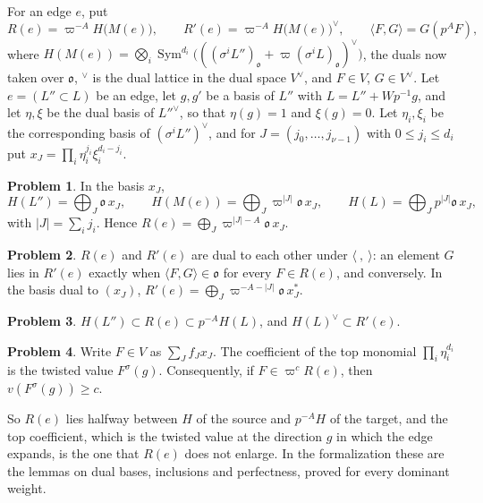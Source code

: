\documentclass[reqno]{amsart}
\theoremstyle{definition}
\newtheorem{problem}{Problem}[section]
\theoremstyle{plain}
\theoremstyle{remark}
\newcommand{\Sym}{\operatorname{Sym}}
\newcommand{\vo}{\mathfrak o}
\begin{document}
For an edge \(e\), put
\[
 R(e)=\varpi^{-A}H\bigl(M(e)\bigr),\qquad R'(e)=\varpi^{-A}H\bigl(M(e)\bigr)^\vee,\qquad \langle F,G\rangle=G(p^AF),
\]
where \(H(M(e))=\bigotimes_i\Sym^{d_i}\bigl(((\sigma^iL'')_\vo+\varpi(\sigma^iL)_\vo)^\vee\bigr)\), the duals now taken over \(\vo\), \({}^\vee\) is the dual lattice in the dual space \(V^\vee\), and \(F\in V\), \(G\in V^\vee\).  Let \(e=(L''\subset L)\) be an edge, let \(g,g'\) be a basis of \(L''\) with \(L=L''+Wp^{-1}g\), and let \(\eta,\xi\) be the dual basis of \(L''^\vee\), so that \(\eta(g)=1\) and \(\xi(g)=0\).  Let \(\eta_i,\xi_i\) be the corresponding basis of \((\sigma^iL'')^\vee\), and for \(J=(j_0,\dots,j_{\nu-1})\) with \(0\le j_i\le d_i\) put \(x_J=\prod_i\eta_i^{j_i}\xi_i^{d_i-j_i}\).

\begin{problem}\label{pr:adapted}
In the basis \(x_J\),
\[
 H(L'')=\bigoplus_J\vo\,x_J,\qquad H(M(e))=\bigoplus_J\varpi^{\lvert J\rvert}\vo\,x_J,\qquad H(L)=\bigoplus_Jp^{\lvert J\rvert}\vo\,x_J,
\]
with \(\lvert J\rvert=\sum_ij_i\).  Hence \(R(e)=\bigoplus_J\varpi^{\lvert J\rvert-A}\vo\,x_J\).
\end{problem}

\begin{problem}\label{pr:perfect}
\(R(e)\) and \(R'(e)\) are dual to each other under \(\langle\ ,\ \rangle\): an element \(G\) lies in \(R'(e)\) exactly when \(\langle F,G\rangle\in\vo\) for every \(F\in R(e)\), and conversely.  In the basis dual to \((x_J)\), \(R'(e)=\bigoplus_J\varpi^{-A-\lvert J\rvert}\vo\,x_J^*\).
\end{problem}

\begin{problem}\label{pr:inclusions}
\(H(L'')\subset R(e)\subset p^{-A}H(L)\), and \(H(L)^\vee\subset R'(e)\).
\end{problem}

\begin{problem}\label{pr:top-coefficient}
Write \(F\in V\) as \(\sum_Jf_Jx_J\).  The coefficient of the top monomial \(\prod_i\eta_i^{d_i}\) is the twisted value \(F^\sigma(g)\).  Consequently, if \(F\in\varpi^cR(e)\), then \(v(F^\sigma(g))\ge c\).
\end{problem}

So \(R(e)\) lies halfway between \(H\) of the source and \(p^{-A}H\) of the target, and the top coefficient, which is the twisted value at the direction \(g\) in which the edge expands, is the one that \(R(e)\) does not enlarge.  In the formalization these are the lemmas on dual bases, inclusions and perfectness, proved for every dominant weight.
\end{document}

